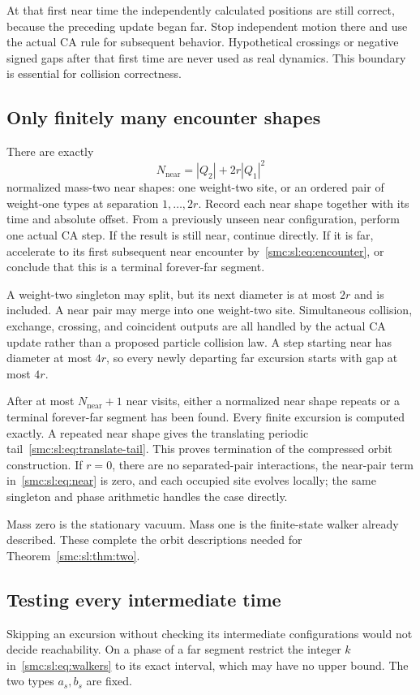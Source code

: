 \documentclass[11pt,letterpaper]{article}
\numberwithin{equation}{section}
\theoremstyle{definition}
\theoremstyle{remark}
\begin{document}
At that first near time the independently calculated positions are still correct, because the preceding update began far. Stop independent motion there and use the actual CA rule for subsequent behavior. Hypothetical crossings or negative signed gaps after that first time are never used as real dynamics. This boundary is essential for collision correctness.

\subsection{Only finitely many encounter shapes}
There are exactly
\begin{equation}\label{smc:sl:eq:near}
 N_{\mathrm{near}}=|Q_2|+2r|Q_1|^2
\end{equation}
normalized mass-two near shapes: one weight-two site, or an ordered pair of weight-one types at separation $1,\ldots,2r$. Record each near shape together with its time and absolute offset. From a previously unseen near configuration, perform one actual CA step. If the result is still near, continue directly. If it is far, accelerate to its first subsequent near encounter by~\eqref{smc:sl:eq:encounter}, or conclude that this is a terminal forever-far segment.

A weight-two singleton may split, but its next diameter is at most $2r$ and is included. A near pair may merge into one weight-two site. Simultaneous collision, exchange, crossing, and coincident outputs are all handled by the actual CA update rather than a proposed particle collision law. A step starting near has diameter at most $4r$, so every newly departing far excursion starts with gap at most $4r$.

After at most $N_{\mathrm{near}}+1$ near visits, either a normalized near shape repeats or a terminal forever-far segment has been found. Every finite excursion is computed exactly. A repeated near shape gives the translating periodic tail~\eqref{smc:sl:eq:translate-tail}. This proves termination of the compressed orbit construction. If $r=0$, there are no separated-pair interactions, the near-pair term in~\eqref{smc:sl:eq:near} is zero, and each occupied site evolves locally; the same singleton and phase arithmetic handles the case directly.

Mass zero is the stationary vacuum. Mass one is the finite-state walker already described. These complete the orbit descriptions needed for Theorem~\ref{smc:sl:thm:two}.

\subsection{Testing every intermediate time}
Skipping an excursion without checking its intermediate configurations would not decide reachability. On a phase of a far segment restrict the integer $k$ in~\eqref{smc:sl:eq:walkers} to its exact interval, which may have no upper bound. The two types $a_s,b_s$ are fixed.
\end{document}
